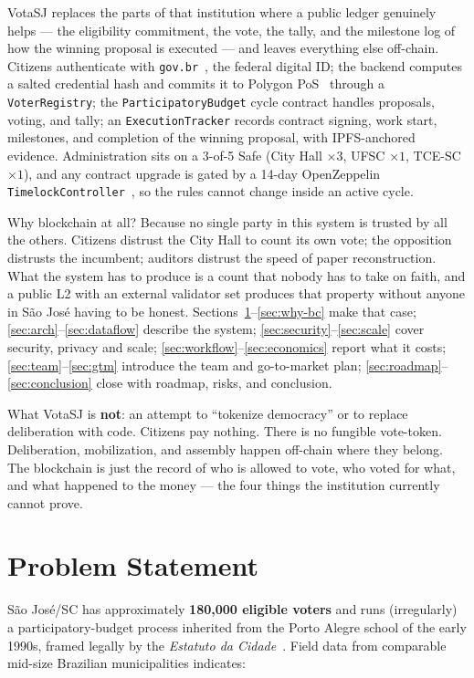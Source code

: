 \documentclass[12pt]{article}
\begin{document}
VotaSJ replaces the parts of that institution where a public ledger
genuinely helps --- the eligibility commitment, the vote, the tally, and
the milestone log of how the winning proposal is executed --- and leaves
everything else off-chain. Citizens authenticate with
\texttt{gov.br}~\cite{govbrmanual}, the federal digital ID; the backend
computes a salted credential hash and commits it to Polygon
PoS~\cite{polygondocs} through a \texttt{VoterRegistry}; the
\texttt{ParticipatoryBudget} cycle contract handles proposals, voting, and
tally; an \texttt{ExecutionTracker} records contract signing, work start,
milestones, and completion of the winning proposal, with IPFS-anchored
evidence. Administration sits on a 3-of-5 Safe (City Hall $\times 3$, UFSC
$\times 1$, TCE-SC $\times 1$), and any contract upgrade is gated by a
14-day OpenZeppelin \texttt{TimelockController}~\cite{openzeppelin5}, so
the rules cannot change inside an active cycle.

Why blockchain at all? Because no single party in this system is trusted
by all the others. Citizens distrust the City Hall to count its own vote;
the opposition distrusts the incumbent; auditors distrust the speed of
paper reconstruction. What the system has to produce is a count that
nobody has to take on faith, and a public L2 with an external validator
set produces that property without anyone in S\~ao Jos\'e having to be
honest. Sections~\ref{sec:problem}--\ref{sec:why-bc} make that case;
\ref{sec:arch}--\ref{sec:dataflow} describe the system;
\ref{sec:security}--\ref{sec:scale} cover security, privacy and scale;
\ref{sec:workflow}--\ref{sec:economics} report what it costs;
\ref{sec:team}--\ref{sec:gtm} introduce the team and go-to-market plan;
\ref{sec:roadmap}--\ref{sec:conclusion} close with roadmap, risks, and
conclusion.

What VotaSJ is \textbf{not}: an attempt to ``tokenize democracy'' or to
replace deliberation with code. Citizens pay nothing. There is no fungible
vote-token. Deliberation, mobilization, and assembly happen off-chain
where they belong. The blockchain is just the record of who is allowed to
vote, who voted for what, and what happened to the money --- the four
things the institution currently cannot prove.

\section{Problem Statement}
\label{sec:problem}

S\~ao Jos\'e/SC has approximately \textbf{180{,}000 eligible voters} and runs
(irregularly) a participatory-budget process inherited from the Porto Alegre
school of the early 1990s, framed legally by the \emph{Estatuto da
Cidade}~\cite{estatutodacidade}. Field data from comparable mid-size Brazilian
municipalities indicates:
\end{document}
